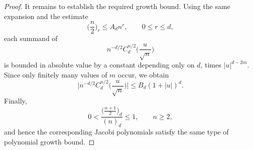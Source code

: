 \documentclass[11pt,showkeys]{amsart}
\begin{document}
\begin{proof}
It remains to establish the required growth bound. Using the same
expansion and the estimate
\[
        \biggl(\frac n2\biggr)_r
        \leq
        A_d n^r,
        \qquad 0\leq r\leq d,
\]
each summand of
\[
        n^{-d/2}
        C_d^{n/2}\biggl(\frac{u}{\sqrt n}\biggr)
\]
is bounded in absolute value by a constant depending only on \(d\),
times \(|u|^{d-2m}\). Since only finitely many values of \(m\) occur, we
obtain
\[
        \biggl|
        n^{-d/2}
        C_d^{n/2}\biggl(\frac{u}{\sqrt n}\biggr)
        \biggr|
        \leq
        B_d(1+|u|)^d.
\]
Finally,
\[
        0<
        \frac{\bigl(\frac{n+1}{2}\bigr)_d}{(n)_d}
        \leq 1,
        \qquad n\geq2,
\]
and hence the corresponding Jacobi polynomials satisfy the same type of
polynomial growth bound.
\end{proof}

\smallskip
\end{document}
